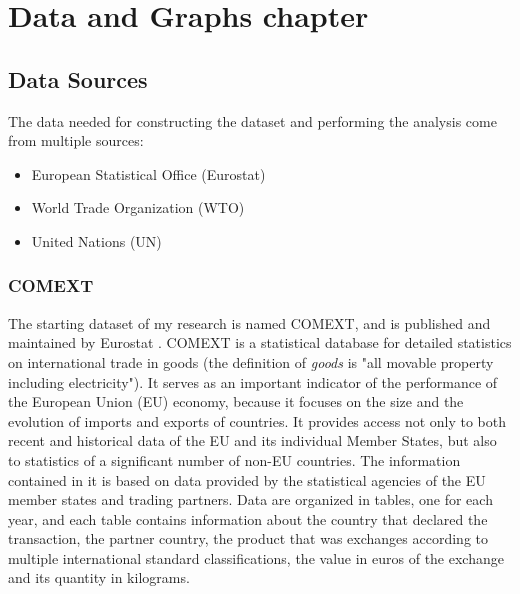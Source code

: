 \chapter{Data and Graphs chapter}

\section{Data Sources}

The data needed for constructing the dataset and performing the analysis come from multiple sources:
\begin{itemize}
    \item European Statistical Office (Eurostat) \cite{eurostat2022comext}
    \item World Trade Organization (WTO) \cite{wto2022stats}
    \item United Nations (UN) \cite{un2022population}
\end{itemize}

\subsection{COMEXT}

The starting dataset of my research is named COMEXT, and is published and maintained by Eurostat \cite{eurostat2022comext}. COMEXT is a statistical database for detailed statistics on international trade in goods (the definition of \textit{goods} is "all movable property including electricity"). It serves as an important indicator of the performance of the European Union (EU) economy, because it focuses on the size and the evolution of imports and exports of countries. It provides access not only to both recent and historical data of the EU and its individual Member States, but also to statistics of a significant number of non-EU countries. The information contained in it is based on data provided by the statistical agencies of the EU member states and trading partners.
Data are organized in tables, one for each year, and each table contains information about the country that declared the transaction, the partner country, the product that was exchanges according to multiple international standard classifications, the value in euros of the exchange and its quantity in kilograms.


